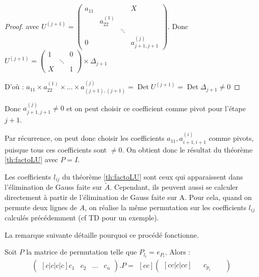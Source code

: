 \documentclass[a4paper,11pt]{article}
\DeclareMathOperator{\Det}{Det}
\theoremstyle{plain} %
\begin{document}
\begin{proof}
    avec $U^{(j+1)} = 
    \begin{pmatrix} 
        a_{11} & & & X \\
        & a_{22}^{(1)} & & \\
        & & \ddots & \\
        0 & & & a_{j+1,j+1}^{(j)}
    \end{pmatrix}$.
    Donc $U^{(j+1)} = 
            \begin{pmatrix}
                1 & & 0 \\
                & \ddots & \\
                X & & 1
            \end{pmatrix}
            \times \Delta_{j+1}$
            
            D'où : $a_{11} \times a_{22}^{(1)} \times \dots \times a^{(j)}_{(j+1),(j+1)} = \Det U^{(j+1)} = \Det \Delta_{j+1} \ne 0$ 
\end{proof}

Donc $a^{(j)}_{j+1,j+1} \ne 0$ et on peut choisir ce coefficient comme pivot pour l'étape $j+1$.

Par récurrence, on peut donc choisir les coefficients $a_{11}, a_{i+1,i+1}^{(i)}$ comme pivots, puisque tous ces coefficients sont $\ne 0$. On obtient donc le résultat du théorème \ref{th:factoLU} avec $P=I$.


\begin{remark}
    Les coefficients $l_{ij}$ du théorème \ref{th:factoLU} sont ceux qui apparaissent dans l'élimination de Gauss faite sur $\tilde{A}$. Cependant, ils peuvent aussi se calculer directement à partir de l'élimination de Gauss faite sur A. Pour cela, quand on permute deux lignes de $A$, on réalise la même permutation sur les coefficients $l_{ij}$ calculés précédemment (cf TD pour un exemple).

    La remarque suivante détaille pourquoi ce procédé fonctionne.
\end{remark}

\begin{remark}
    Soit $P$ la matrice de permutation telle que $P_{l_{i}} = e_{P_i}$.
    Alors :
    \[
        \begin{pmatrix}[c|c|c|c]
            c_1 & c_2 & \dots & c_n
        \end{pmatrix}
        .
        P
        =
        \begin{matrix}[cc]
        \begin{pmatrix}[cc|c|cc]
            & & c_{p_i} & & 
        \end{pmatrix}
        \end{matrix}
    \]
\end{remark}
\end{document}
